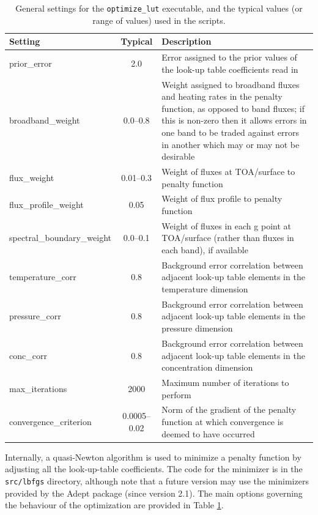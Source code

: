 \documentclass[a4,oneside]{article}
\def\codesize{\small}
\def\codesize{\small}
\def\code#1{{\codesize\texttt{#1}}}
\begin{document}
\begin{table}[tb!]
\caption{\label{tab:optimize}General settings for the
  \code{optimize\_lut} executable, and the typical values (or range of
  values) used in the scripts.}
\begin{center}
\begin{tabular}{lc>{\raggedright\arraybackslash}p{9cm}}
\hline
Setting & Typical & Description\\
\hline
prior\_error & 2.0 & Error assigned to the prior values of the look-up table coefficients read in \\
broadband\_weight & 0.0--0.8 & Weight assigned to broadband fluxes and heating rates in the penalty function, as opposed to band fluxes; if this is non-zero then it allows errors in one band to be traded against errors in another which may or may not be desirable\\
flux\_weight & 0.01--0.3 & Weight of fluxes at TOA/surface to penalty function\\
flux\_profile\_weight & 0.05 & Weight of flux profile to penalty function \\
spectral\_boundary\_weight & 0.0--0.1 & Weight of fluxes in each g point at TOA/surface (rather than fluxes in each band), if available\\
temperature\_corr & 0.8 & Background error correlation between adjacent look-up table elements in the temperature dimension\\
pressure\_corr & 0.8  & Background error correlation between adjacent look-up table elements in the pressure dimension\\
conc\_corr & 0.8  & Background error correlation between adjacent look-up table elements in the concentration dimension\\
max\_iterations & 2000 & Maximum number of iterations to perform \\
convergence\_criterion & 0.0005--0.02 & Norm of the gradient of the penalty function at which convergence is deemed to have occurred \\
\hline
\end{tabular}
\end{center}
\end{table}

Internally, a quasi-Newton algorithm is used to minimize a penalty
function by adjusting all the look-up-table coefficients.  The code
for the minimizer is in the \code{src/lbfgs} directory, although note
that a future version may use the minimizers provided by the Adept
package (since version 2.1). The main options governing the behaviour of
the optimization are provided in Table \ref{tab:optimize}.
\end{document}
